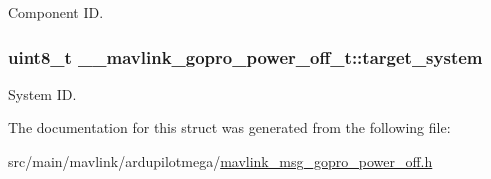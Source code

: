 Component I\+D. 

\hypertarget{struct____mavlink__gopro__power__off__t_ace6f688f8ee0583a4f80ca9f65b3bab8}{
\subsubsection[{target\+\_\+system}]{\setlength{\rightskip}{0pt plus 5cm}uint8\+\_\+t \+\_\+\+\_\+mavlink\+\_\+gopro\+\_\+power\+\_\+off\+\_\+t\+::target\+\_\+system}}\label{struct____mavlink__gopro__power__off__t_ace6f688f8ee0583a4f80ca9f65b3bab8}


System I\+D. 



The documentation for this struct was generated from the following file\+:\begin{DoxyCompactItemize}
\item 
src/main/mavlink/ardupilotmega/\hyperlink{mavlink__msg__gopro__power__off_8h}{mavlink\+\_\+msg\+\_\+gopro\+\_\+power\+\_\+off.\+h}\end{DoxyCompactItemize}

